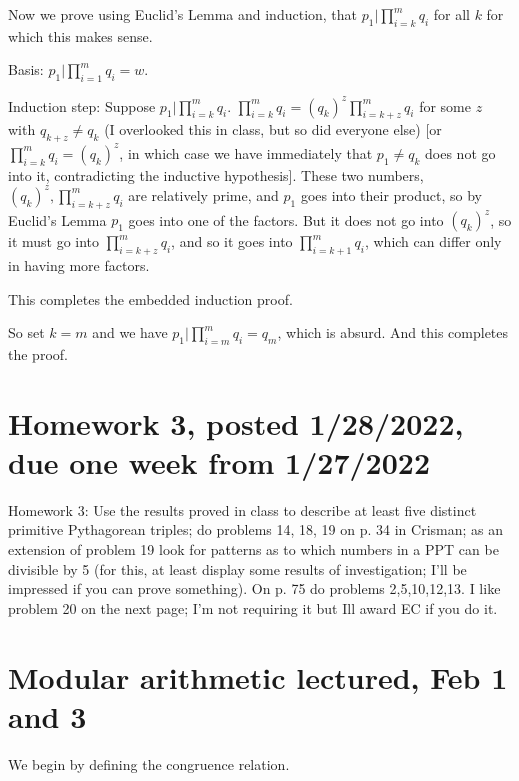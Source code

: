 \documentclass[12pt]{article}
\begin{document}
\begin{description}
Now we prove using Euclid's Lemma and induction, that $p_1 | \prod_{i=k}^m q_i$ for all $k$ for which this makes sense.

Basis:  $p_1 | \prod_{i=1}^m q_i = w$.

Induction step:  Suppose $p_1 | \prod_{i=k}^m q_i$.  $\prod_{i=k}^m q_i= (q_k)^z\prod_{i=k+z}^m q_i$ for some $z$ with $q_{k+z}\neq q_k$ (I overlooked this in class, but so did everyone else) [or $\prod_{i=k}^m q_i= (q_k)^z$, in which case we have immediately that $p_1\neq q_k$ does not go into it, contradicting the inductive hypothesis].  These two numbers,  $(q_k)^z, \prod_{i=k+z}^m q_i$ are relatively prime, and $p_1$ goes into their product, so by Euclid's Lemma $p_1$ goes into one of the factors.  But it does not go into $(q_k)^z$, so it must go into $\prod_{i=k+z}^m q_i$,
and so it goes into $\prod_{i=k+1}^m q_i$, which can differ only in having more factors.

This completes the embedded induction proof.

So set $k=m$ and we have $p_1 | \prod_{i=m}^m q_i = q_m$, which is absurd. And this completes the proof.


\newpage

\end{description}


\section{Homework 3, posted 1/28/2022, due one week from 1/27/2022}

Homework 3: Use the results proved in class to describe at least five distinct primitive Pythagorean triples; do problems 14, 18, 19 on p. 34 in Crisman; as an extension of problem 19 look for patterns as to which numbers in a PPT can be divisible by 5 (for this, at least display some results of investigation; I'll be impressed if you can prove something). On p. 75 do problems 2,5,10,12,13. I like problem 20 on the next page; I'm not requiring it but Ill award EC if you do it.

\newpage

\section{Modular arithmetic lectured, Feb 1 and 3}

We begin by defining the congruence relation.
\end{document}
